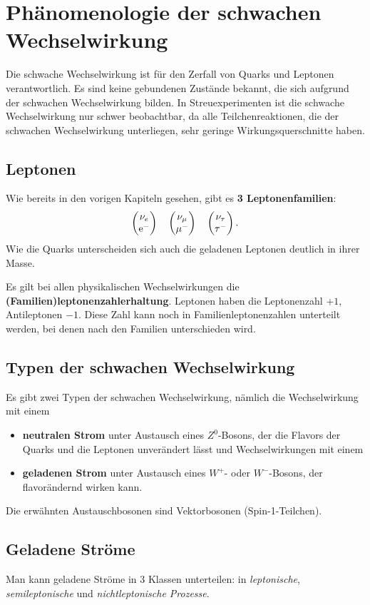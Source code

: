 \chapter{Phänomenologie der schwachen Wechselwirkung}
Die schwache Wechselwirkung ist für den Zerfall von Quarks und Leptonen verantwortlich.
Es sind keine gebundenen Zustände bekannt, die sich aufgrund der schwachen Wechselwirkung bilden.
In Streuexperimenten ist die schwache Wechselwirkung nur schwer beobachtbar, da alle Teilchenreaktionen, die der schwachen Wechselwirkung unterliegen, sehr geringe Wirkungsquerschnitte haben.

\section{Leptonen}
Wie bereits in den vorigen Kapiteln gesehen, gibt es \textbf{3 Leptonenfamilien}:
\begin{equation*}
	\begin{pmatrix} \nu_e \\ \text{e}^- \end{pmatrix}\quad\begin{pmatrix} \nu_\mu \\ \mu^- \end{pmatrix}\quad\begin{pmatrix} \nu_\tau \\ \tau^- \end{pmatrix}.
\end{equation*}
Wie die Quarks unterscheiden sich auch die geladenen Leptonen deutlich in ihrer Masse.

Es gilt bei allen physikalischen Wechselwirkungen die \textbf{(Familien)leptonenzahlerhaltung}.
Leptonen haben die Leptonenzahl $+1$, Antileptonen $-1$.
Diese Zahl kann noch in Familienleptonenzahlen unterteilt werden, bei denen nach den Familien unterschieden wird.

\section{Typen der schwachen Wechselwirkung}
Es gibt zwei Typen der schwachen Wechselwirkung, nämlich die Wechselwirkung mit einem
\begin{itemize}
	\item \textbf{neutralen Strom} unter Austausch eines $Z^0$-Bosons, der die Flavors der Quarks und die Leptonen unverändert lässt und Wechselwirkungen mit einem
	\item \textbf{geladenen Strom} unter Austausch eines $W^+$- oder $W^-$-Bosons, der flavorändernd wirken kann.
\end{itemize}

Die erwähnten Austauschbosonen sind Vektorbosonen (Spin-1-Teilchen).

\section{Geladene Ströme}
Man kann geladene Ströme in 3 Klassen unterteilen: in \textit{leptonische}, \textit{semileptonische} und \textit{nichtleptonische Prozesse}.

